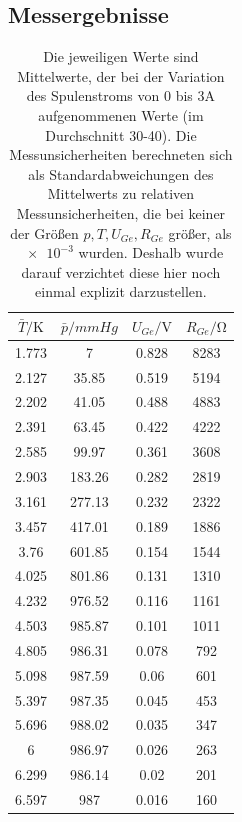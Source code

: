 \documentclass[german,  %
parskip=full,  %
headsepline]{scrartcl}
\begin{document}
\subsection{Messergebnisse}
\begin{table}[!htp]
    \centering
    \begin{tabular}{c|c|c|c}
         $\bar{\si{T}}/\si{\kelvin}$&$\bar{\si{p}}/\si{mmHg} $&$U_{Ge}/\si{\volt}$&$R_{Ge}/\si{\ohm}$\\ \hline \hline
         1.773  & 7       & 0.828  & 8283   \\
        2.127  & 35.85   & 0.519  & 5194   \\
        2.202  & 41.05   & 0.488  & 4883   \\
        2.391  & 63.45   & 0.422  & 4222   \\
        2.585  & 99.97   & 0.361  & 3608   \\
        2.903  & 183.26  & 0.282  & 2819   \\
        3.161  & 277.13  & 0.232  & 2322   \\
        3.457  & 417.01  & 0.189  & 1886   \\
        3.76   & 601.85  & 0.154  & 1544   \\
        4.025  & 801.86  & 0.131  & 1310   \\
        4.232  & 976.52  & 0.116  & 1161   \\
        4.503  & 985.87  & 0.101  & 1011   \\
        4.805  & 986.31  & 0.078  & 792    \\
        5.098  & 987.59  & 0.06   & 601    \\
        5.397  & 987.35  & 0.045  & 453    \\
        5.696  & 988.02  & 0.035  & 347    \\
        6      & 986.97  & 0.026  & 263    \\
        6.299  & 986.14  & 0.02   & 201    \\
        6.597  & 987     & 0.016  & 160   
    \end{tabular}
    \caption{Die jeweiligen Werte sind Mittelwerte, der bei der Variation des Spulenstroms von 0 bis 3A aufgenommenen Werte (im Durchschnitt 30-40). Die Messunsicherheiten berechneten sich als Standardabweichungen des Mittelwerts zu relativen Messunsicherheiten, die bei keiner der Größen $p, T, U_{Ge}, R_{Ge}$ größer, als $\num{e-3}$ wurden. Deshalb wurde darauf verzichtet diese hier noch einmal explizit darzustellen.}
    \label{tab:my_label}
\end{table}
\pagebreak
\end{document}
